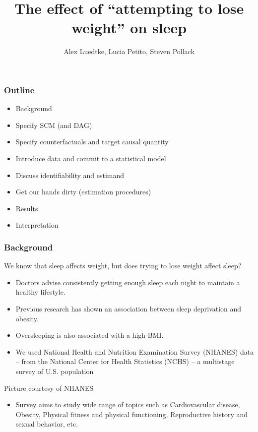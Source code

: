 \documentclass{beamer}
\title[Project Presentation]{ The effect of ``attempting to lose weight'' on sleep }
\author{Alex Luedtke, Lucia Petito, Steven Pollack}
\institute{PHC252D}
\date{}
\begin{document}
\maketitle 
\begin{frame}
 \frametitle{Outline} %
  \begin{itemize}
    \item Background
    \item Specify SCM (and DAG)
    \item Specify counterfactuals and target causal quantity
    \item Introduce data and commit to a statistical model
    \item Discuss identifiability and estimand
    \item Get our hands dirty (estimation procedures)
    \item Results
    \item Interpretation
  \end{itemize}
\end{frame}

\begin{frame}
 \frametitle{Background}
 We know that sleep affects weight, but does trying to lose weight affect sleep?
  \begin{itemize}
    \item Doctors advise consistently getting enough sleep each night to maintain a healthy lifestyle.  
    \item Previous research has shown an association between sleep deprivation and obesity.
    \item Oversleeping is also associated with a high BMI.
  \end{itemize}
\end{frame}

\begin{frame}
 \begin{itemize}
  \item We used National Health and Nutrition Examination Survey (NHANES) data -- from the National Center for Health Statistics (NCHS) -- a multistage survey of U.S. population
 \end{itemize}
 \begin{center}
    {\tiny Picture courtesy of NHANES}
 \end{center}
 \begin{itemize}
  \item Survey aims to study wide range of topics such as Cardiovascular disease, Obesity, Physical fitness and physical functioning, Reproductive history and sexual behavior, etc.
 \end{itemize}
\end{frame}
\end{document}
